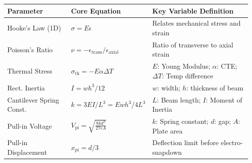 \documentclass[12pt,a4paper]{article}
\renewcommand{\arraystretch}{1.45}
\begin{document}
\begin{tcolorbox}[formulabox, title={\textbf{Key Mechanical \& Electrostatic Equations}}]
\renewcommand{\arraystretch}{1.3}
\begin{tabularx}{\linewidth}{B{3.8cm} Y Y}
\textbf{Parameter} & \textbf{Core Equation} & \textbf{Key Variable Definition} \\
\hline
Hooke's Law (1D) & $\sigma = E \epsilon$ & Relates mechanical stress and strain \\[4pt]
Poisson's Ratio & $\nu = -\epsilon_{\text{trans}} / \epsilon_{\text{axial}}$ & Ratio of transverse to axial strain \\[4pt]
Thermal Stress & $\sigma_{\text{th}} = -E \alpha \Delta T$ & $E$: Young Modulus; $\alpha$: CTE; $\Delta T$: Temp difference \\[4pt]
Rect. Inertia & $I = w h^3 / 12$ & $w$: width; $h$: thickness of beam \\[4pt]
Cantilever Spring Const. & $k = 3EI / L^3 = E w h^3 / 4L^3$ & $L$: Beam length; $I$: Moment of Inertia \\[4pt]
Pull-in Voltage & $\displaystyle V_{\text{pi}} = \sqrt{\frac{8 k d^3}{27 \epsilon A}}$ & $k$: Spring constant; $d$: gap; $A$: Plate area \\[6pt]
Pull-in Displacement & $x_{\text{pi}} = d / 3$ & Deflection limit before electro-snapdown \\
\end{tabularx}
\end{tcolorbox}
\end{document}
